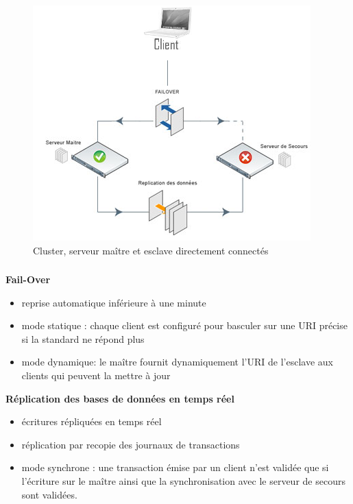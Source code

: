 \begin{figure}[htbp]
	\centering
	\includegraphics[scale=0.6]{Images/SchemaCluster.png}
	\caption{Cluster, serveur maître et esclave directement connectés}
	\label{SchemaCluster}
\end{figure}

\begin{frame}
\frametitle{}
\begin{block}{\textbf{Fail-Over}}
\begin{itemize}
\item reprise automatique inférieure à une minute
\item mode statique : chaque client est configuré pour basculer sur une URI précise si la standard ne répond plus
\item mode dynamique: le maître fournit dynamiquement l'URI de l'esclave aux clients qui peuvent la mettre à jour
\end{itemize}
\end{block}
\begin{block}{\textbf{Réplication des bases de données en temps réel}}
\begin{itemize}
\item écritures répliquées en temps réel
\item réplication par recopie des journaux de transactions
\item mode synchrone : une transaction émise par un client n'est validée que si l'écriture sur le maître ainsi que la synchronisation avec le serveur de secours sont validées.
\end{itemize}
\end{block}
\end{frame}

